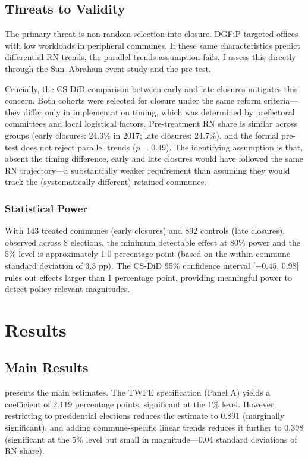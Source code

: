 \documentclass[12pt]{article}
\begin{document}
\subsection{Threats to Validity}

The primary threat is non-random selection into closure. DGFiP targeted offices with low workloads in peripheral communes. If these same characteristics predict differential RN trends, the parallel trends assumption fails. I assess this directly through the Sun--Abraham event study and the \citet{callaway2021difference} pre-test.

Crucially, the CS-DiD comparison between early and late closures mitigates this concern. Both cohorts were selected for closure under the same reform criteria---they differ only in implementation timing, which was determined by prefectoral committees and local logistical factors. Pre-treatment RN share is similar across groups (early closures: 24.3\% in 2017; late closures: 24.7\%), and the formal pre-test does not reject parallel trends ($p = 0.49$). The identifying assumption is that, absent the timing difference, early and late closures would have followed the same RN trajectory---a substantially weaker requirement than assuming they would track the (systematically different) retained communes.

\subsubsection*{Statistical Power} With 143 treated communes (early closures) and 892 controls (late closures), observed across 8 elections, the minimum detectable effect at 80\% power and the 5\% level is approximately 1.0 percentage point (based on the within-commune standard deviation of 3.3 pp). The CS-DiD 95\% confidence interval [$-0.45$, $0.98$] rules out effects larger than 1 percentage point, providing meaningful power to detect policy-relevant magnitudes.

\section{Results}

\subsection{Main Results}



 presents the main estimates. The TWFE specification (Panel A) yields a coefficient of 2.119 percentage points, significant at the 1\% level. However, restricting to presidential elections reduces the estimate to 0.891 (marginally significant), and adding commune-specific linear trends reduces it further to 0.398 (significant at the 5\% level but small in magnitude---0.04 standard deviations of RN share).
\end{document}
